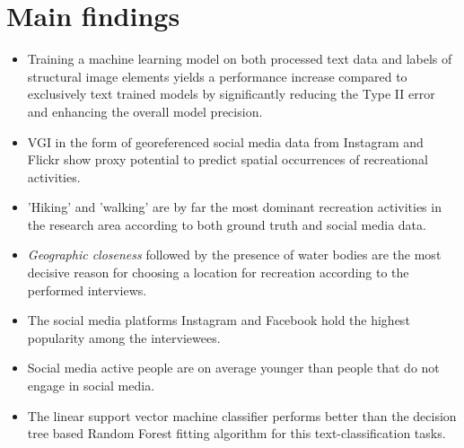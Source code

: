 \clearpage

\section{Main findings}

\begin{itemize}
  \item Training a machine learning model on both processed text data and labels of structural image elements yields a performance increase compared to exclusively text trained models by significantly reducing the Type II error and enhancing the overall model precision.
  \item VGI in the form of georeferenced social media data from Instagram and Flickr show proxy potential to predict spatial occurrences of recreational activities.
  \item 'Hiking' and 'walking' are by far the most dominant recreation activities in the research area according to both ground truth and social media data.
  \item \textit{Geographic closeness} followed by the presence of water bodies are the most decisive reason for choosing a location for recreation according to the performed interviews.
  \item The social media platforms Instagram and Facebook hold the highest popularity among the interviewees.
  \item Social media active people are on average younger than people that do not engage in social media.
  \item The linear support vector machine classifier performs better than the decision tree based Random Forest fitting algorithm for this text-classification tasks. 
\end{itemize}


